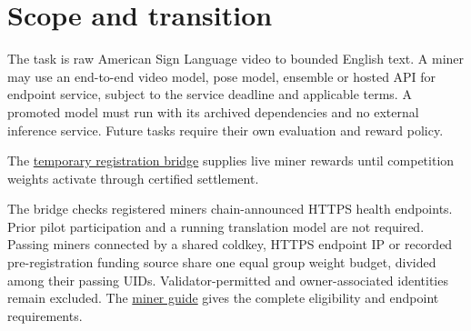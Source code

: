 \begin{abstract}

UMI develops ASL-to-English translation through two complementary forms of
competition. Endpoint miners serve translations using systems they control.
Model contributors submit reproducible, licensed model bundles that UMI can
preserve and operate independently. Both are evaluated against held-out ASL
examples. Verified improvements can become the next public reference model.

The network must produce useful translations and an accumulating body of
runnable models. Access to a successful endpoint alone cannot meet the second
objective. Model promotion therefore requires possession of the model files,
a reproducible inference environment, documented rights, and verification
without the original miner or an external inference API.

The first successor release separates implementation rehearsal from reward
activation. No existing miner must disclose proprietary weights retroactively.
The private endpoint track remains available under its published rules; the
model-contribution track has explicit publication and reuse terms.

\end{abstract}

\section{Scope and transition}\label{1-scope-and-transition}

The task is raw American Sign Language video to bounded English text.
A miner may use an end-to-end video model, pose model, ensemble or hosted API
for endpoint service, subject to the service deadline and applicable terms.
A promoted model must run with its archived dependencies and no external
inference service. Future tasks require their own evaluation and reward policy.

The \href{https://github.com/Umi-BitSign/umi/blob/main/docs/operators/bridge.md}{temporary registration bridge} supplies live
miner rewards until competition weights activate through certified settlement.

The bridge checks registered miners\textquotesingle{} chain-announced HTTPS health endpoints.
Prior pilot participation and a running translation model are not required.
Passing miners connected by a shared coldkey, HTTPS endpoint IP or recorded
pre-registration funding source share one equal group weight budget, divided
among their passing UIDs. Validator-permitted and owner-associated identities
remain excluded. The \href{https://github.com/Umi-BitSign/umi/blob/main/docs/CURRENT_MINER_OPERATION.md}{miner guide} gives the
complete eligibility and endpoint requirements.

